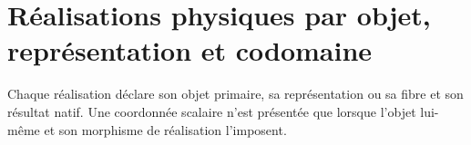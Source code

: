 \section{Réalisations physiques par objet, représentation et codomaine}
Chaque réalisation déclare son objet primaire, sa représentation ou sa fibre et son résultat natif. Une coordonnée scalaire n'est présentée que lorsque l'objet lui-même et son morphisme de réalisation l'imposent.

